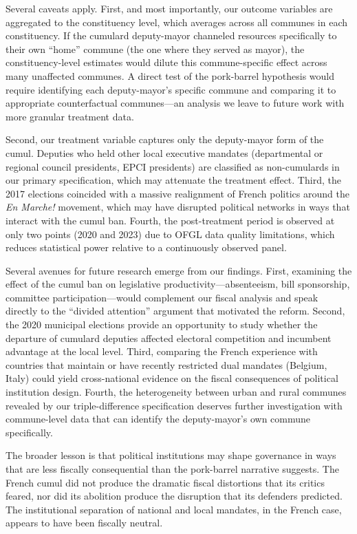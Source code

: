 \documentclass[12pt]{article}
\begin{document}
Several caveats apply. First, and most importantly, our outcome variables are aggregated to the constituency level, which averages across all communes in each constituency. If the cumulard deputy-mayor channeled resources specifically to their own ``home'' commune (the one where they served as mayor), the constituency-level estimates would dilute this commune-specific effect across many unaffected communes. A direct test of the pork-barrel hypothesis would require identifying each deputy-mayor's specific commune and comparing it to appropriate counterfactual communes---an analysis we leave to future work with more granular treatment data.

Second, our treatment variable captures only the deputy-mayor form of the cumul. Deputies who held other local executive mandates (departmental or regional council presidents, EPCI presidents) are classified as non-cumulards in our primary specification, which may attenuate the treatment effect. Third, the 2017 elections coincided with a massive realignment of French politics around the \textit{En Marche!} movement, which may have disrupted political networks in ways that interact with the cumul ban. Fourth, the post-treatment period is observed at only two points (2020 and 2023) due to OFGL data quality limitations, which reduces statistical power relative to a continuously observed panel.

Several avenues for future research emerge from our findings. First, examining the effect of the cumul ban on legislative productivity---absenteeism, bill sponsorship, committee participation---would complement our fiscal analysis and speak directly to the ``divided attention'' argument that motivated the reform. Second, the 2020 municipal elections provide an opportunity to study whether the departure of cumulard deputies affected electoral competition and incumbent advantage at the local level. Third, comparing the French experience with countries that maintain or have recently restricted dual mandates (Belgium, Italy) could yield cross-national evidence on the fiscal consequences of political institution design. Fourth, the heterogeneity between urban and rural communes revealed by our triple-difference specification deserves further investigation with commune-level data that can identify the deputy-mayor's own commune specifically.

The broader lesson is that political institutions may shape governance in ways that are less fiscally consequential than the pork-barrel narrative suggests. The French cumul did not produce the dramatic fiscal distortions that its critics feared, nor did its abolition produce the disruption that its defenders predicted. The institutional separation of national and local mandates, in the French case, appears to have been fiscally neutral.
\end{document}

